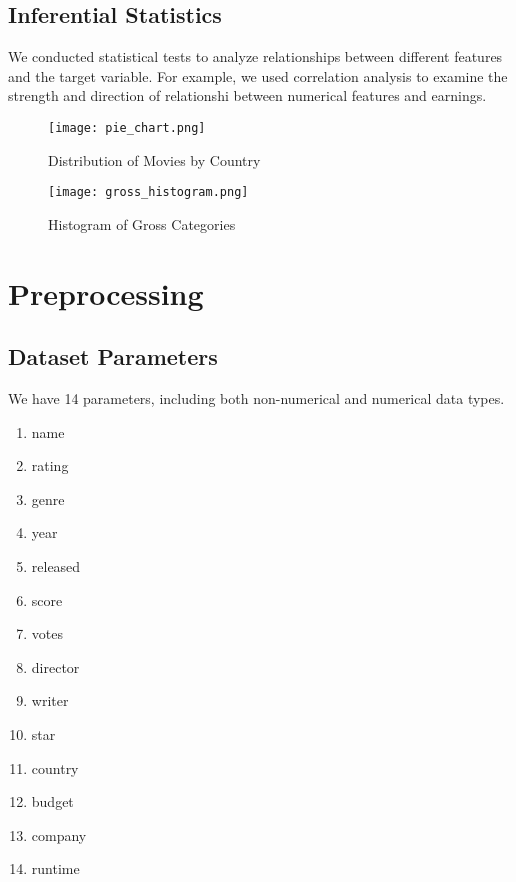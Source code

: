 \documentclass[conference]{IEEEtran}
\begin{document}
    \subsection{Inferential Statistics}
        We conducted statistical tests to analyze relationships between different features and the target variable. For example, we used correlation analysis to examine the strength and direction of  relationshi between numerical features and earnings.
    
    \begin{figure}[h]
        \centering
        \texttt{[image: pie\_chart.png]}
        \caption{Distribution of Movies by Country}
        \label{fig:country-pie-chart}
    \end{figure}
    
    \begin{figure}[h]
        \centering
        \texttt{[image: gross\_histogram.png]}
        \caption{Histogram of Gross Categories}
        \label{fig:gross-histogram}
    \end{figure}

\section{Preprocessing}
    \subsection{Dataset Parameters}
        We have 14 parameters, including both non-numerical and numerical data types.
        
        \begin{enumerate}
            \item name
            \item rating
            \item genre
            \item year
            \item released
            \item score
            \item votes
            \item director
            \item writer
            \item star
            \item country
            \item budget
            \item company
            \item runtime
        \end{enumerate}
        
\end{document}
